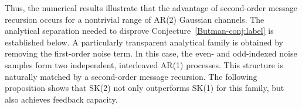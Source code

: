 \documentclass[12pt]{article}
\newtheorem{example}[thm]{Example}
\begin{document}
Thus, the numerical results illustrate that the advantage of second-order message recursion occurs for a nontrivial range of AR(2) Gaussian channels. The analytical separation needed to disprove Conjecture~\ref{Butman-conj:label} is established below. A particularly transparent analytical family is obtained by removing the first-order noise term. In this case, the even- and odd-indexed noise samples form two independent, interleaved AR(1) processes. This structure is naturally matched by a second-order message recursion. The following proposition shows that SK(2) not only outperforms SK(1) for this family, but also achieves feedback capacity.






\end{document}
